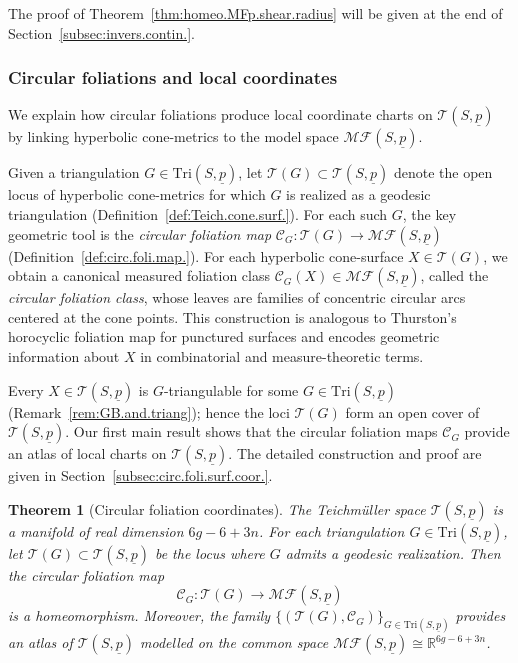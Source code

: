 \documentclass[11pt, letterpaper]{amsart}
\newtheorem{theorem}{\rm\bf Theorem}[section]
\theoremstyle{definition}
\theoremstyle{remark}
\newcommand{\up}{\underline{p}}
\newcommand{\Sp}{(S,\up)}
\newcommand{\TSp}{\text{Tri}\Sp}
\newcommand{\cMFp}{\mathcal{MF} (S,\up)}
\newcommand{\cC}{\mathcal{C}}
\newcommand{\cT}{\mathcal{T}}
\newcommand{\cTp}{\mathcal{T} (S,\up)}
\newcommand{\bR}{\mathbb{R}}
\numberwithin{equation}{section}
\begin{document}
The proof of Theorem~\ref{thm:homeo.MFp.shear.radius} will be given at the end of Section~\ref{subsec:invers.contin.}.


\subsubsection{Circular foliations and local coordinates}
\label{subsubsec:intro.circ-local}

We explain how circular foliations produce local coordinate charts on \(\cTp\) by linking hyperbolic cone-metrics to the model space \(\cMFp\).

Given a triangulation \(G \in \TSp\), let \(\cT(G) \subset \cTp\) denote the open locus of hyperbolic cone-metrics for which \(G\) is realized as a geodesic triangulation (Definition~\ref{def:Teich.cone.surf.}).
For each such \(G\), the key geometric tool is the \emph{circular foliation map}
\(\cC_G : \cT(G) \longrightarrow \cMFp\) (Definition~\ref{def:circ.foli.map.}).
For each hyperbolic cone-surface \(X \in \cT(G)\), we obtain a canonical measured foliation class \(\cC_G(X) \in \cMFp\), called the \emph{circular foliation class}, whose leaves are families of concentric circular arcs centered at the cone points. This construction is analogous to Thurston's horocyclic foliation map for punctured surfaces \cite{Thu98} and encodes geometric information about \(X\) in combinatorial and measure-theoretic terms.



Every \(X\in\cTp\) is \(G\)-triangulable for some \(G\in\TSp\) (Remark~\ref{rem:GB.and.triang}); hence the loci \(\cT(G)\) form an open cover of \(\cTp\).
Our first main result shows that the circular foliation maps \(\cC_G\) provide an atlas of local charts on \(\cTp\).
The detailed construction and proof are given in Section~\ref{subsec:circ.foli.surf.coor.}.



\begin{theorem}[Circular foliation coordinates]\label{thm:Teich.chart}
The Teichm\"uller space \(\cTp\) is a manifold of real dimension \(6g-6+3n\).
For each triangulation \(G\in\TSp\), let \(\cT(G)\subset \cTp\) be the locus where \(G\) admits a geodesic realization.
Then the circular foliation map
\[
\cC_G:\cT(G)\longrightarrow \cMFp
\]
is a homeomorphism.
Moreover, the family \(\{(\cT(G),\cC_G)\}_{G\in\TSp}\) provides an atlas of \(\cTp\) modelled on the common space \(\cMFp\cong \bR^{6g-6+3n}\).
\end{theorem}
\end{document}
